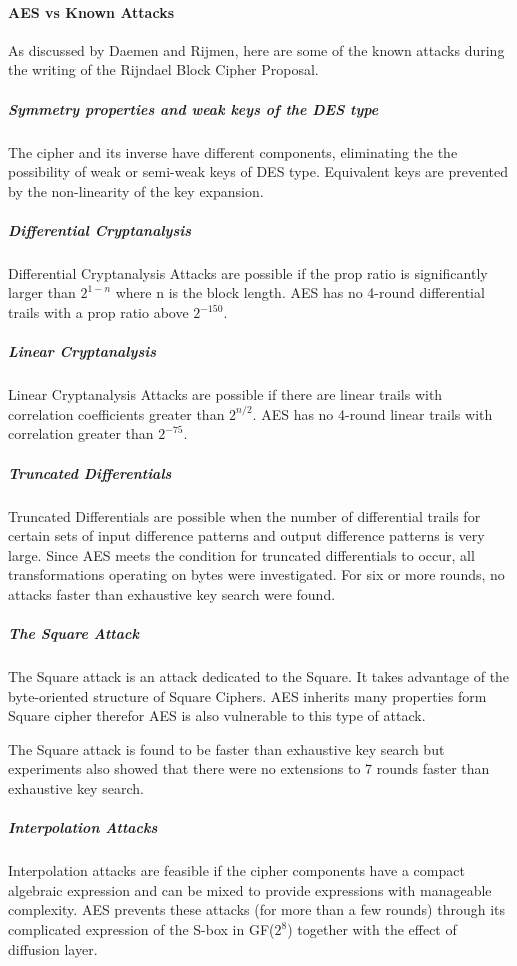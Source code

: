 \documentclass{article}
\begin{document}
\paragraph{AES vs Known Attacks}
As discussed by Daemen and Rijmen\cite{daemen1999}, here are some of the known attacks during the writing of the Rijndael Block Cipher Proposal.

\subparagraph{Symmetry properties and weak keys of the DES type}
The cipher and its inverse have different components, eliminating the the possibility of weak or semi-weak keys of DES type. Equivalent keys are prevented by the non-linearity of the key expansion.

\subparagraph{Differential Cryptanalysis}
Differential Cryptanalysis Attacks are possible if the prop ratio is significantly larger than $2^{1-n}$ where n is the block length. AES has no 4-round differential trails with a prop ratio above $2^{-150}$.

\subparagraph{Linear Cryptanalysis}
Linear Cryptanalysis Attacks are possible if there are linear trails with correlation coefficients greater than $2^{n/2}$. AES has no 4-round linear trails with correlation greater than $2^{-75}$.

\subparagraph{Truncated Differentials}
Truncated Differentials are possible when the number of differential trails for certain sets of input difference patterns and output difference patterns is very large. Since AES meets the condition for truncated differentials to occur, all transformations operating on bytes were investigated. For six or more rounds, no attacks faster than exhaustive key search were found.

\subparagraph{The Square Attack}
The Square attack is an attack dedicated to the Square. It takes advantage of the byte-oriented structure of Square Ciphers. AES inherits many properties form Square cipher therefor AES is also vulnerable to this type of attack.

The Square attack is found to be faster than exhaustive key search but experiments also showed that there were no extensions to 7 rounds faster than exhaustive key search.

\subparagraph{Interpolation Attacks}
Interpolation attacks are feasible if the cipher components have a compact algebraic expression and can be mixed to provide expressions with manageable complexity. AES prevents these attacks (for more than a few rounds) through its complicated expression of the S-box in GF($2^{8}$) together with the effect of diffusion layer.
\end{document}
